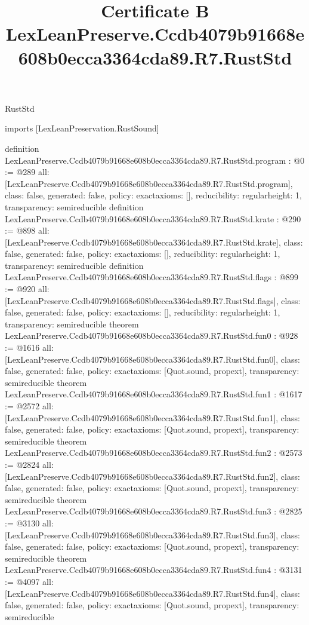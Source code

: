 \begin{lexlean}{RustStd}
\title{Certificate B LexLeanPreserve.Ccdb4079b91668e608b0ecca3364cda89.R7.RustStd}
\begin{coremodule}
imports [LexLeanPreservation.RustSound]

definition LexLeanPreserve.Ccdb4079b91668e608b0ecca3364cda89.R7.RustStd.program : @0 := @289 {
  all: [LexLeanPreserve.Ccdb4079b91668e608b0ecca3364cda89.R7.RustStd.program],
  class: false,
  generated: false,
  policy: exact{axioms: []},
  reducibility: regular{height: 1},
  transparency: semireducible
}
definition LexLeanPreserve.Ccdb4079b91668e608b0ecca3364cda89.R7.RustStd.krate : @290 := @898 {
  all: [LexLeanPreserve.Ccdb4079b91668e608b0ecca3364cda89.R7.RustStd.krate],
  class: false,
  generated: false,
  policy: exact{axioms: []},
  reducibility: regular{height: 1},
  transparency: semireducible
}
definition LexLeanPreserve.Ccdb4079b91668e608b0ecca3364cda89.R7.RustStd.flags : @899 := @920 {
  all: [LexLeanPreserve.Ccdb4079b91668e608b0ecca3364cda89.R7.RustStd.flags],
  class: false,
  generated: false,
  policy: exact{axioms: []},
  reducibility: regular{height: 1},
  transparency: semireducible
}
theorem LexLeanPreserve.Ccdb4079b91668e608b0ecca3364cda89.R7.RustStd.fun0 : @928 := @1616 {
  all: [LexLeanPreserve.Ccdb4079b91668e608b0ecca3364cda89.R7.RustStd.fun0],
  class: false,
  generated: false,
  policy: exact{axioms: [Quot.sound, propext]},
  transparency: semireducible
}
theorem LexLeanPreserve.Ccdb4079b91668e608b0ecca3364cda89.R7.RustStd.fun1 : @1617 := @2572 {
  all: [LexLeanPreserve.Ccdb4079b91668e608b0ecca3364cda89.R7.RustStd.fun1],
  class: false,
  generated: false,
  policy: exact{axioms: [Quot.sound, propext]},
  transparency: semireducible
}
theorem LexLeanPreserve.Ccdb4079b91668e608b0ecca3364cda89.R7.RustStd.fun2 : @2573 := @2824 {
  all: [LexLeanPreserve.Ccdb4079b91668e608b0ecca3364cda89.R7.RustStd.fun2],
  class: false,
  generated: false,
  policy: exact{axioms: [Quot.sound, propext]},
  transparency: semireducible
}
theorem LexLeanPreserve.Ccdb4079b91668e608b0ecca3364cda89.R7.RustStd.fun3 : @2825 := @3130 {
  all: [LexLeanPreserve.Ccdb4079b91668e608b0ecca3364cda89.R7.RustStd.fun3],
  class: false,
  generated: false,
  policy: exact{axioms: [Quot.sound, propext]},
  transparency: semireducible
}
theorem LexLeanPreserve.Ccdb4079b91668e608b0ecca3364cda89.R7.RustStd.fun4 : @3131 := @4097 {
  all: [LexLeanPreserve.Ccdb4079b91668e608b0ecca3364cda89.R7.RustStd.fun4],
  class: false,
  generated: false,
  policy: exact{axioms: [Quot.sound, propext]},
  transparency: semireducible
}
\end{coremodule}
\end{lexlean}
